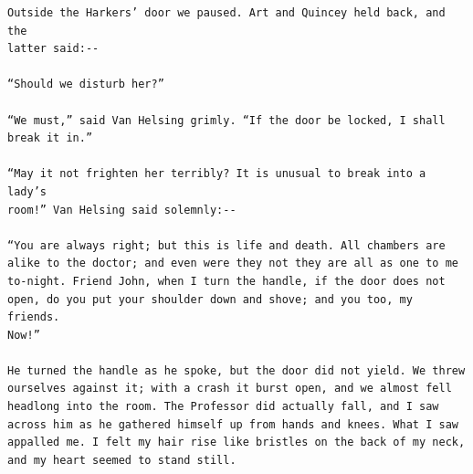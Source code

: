 \documentclass{article}
\begin{document}
\begin{verbatim}
Outside the Harkers’ door we paused. Art and Quincey held back, and the
latter said:--

“Should we disturb her?”

“We must,” said Van Helsing grimly. “If the door be locked, I shall
break it in.”

“May it not frighten her terribly? It is unusual to break into a lady’s
room!” Van Helsing said solemnly:--

“You are always right; but this is life and death. All chambers are
alike to the doctor; and even were they not they are all as one to me
to-night. Friend John, when I turn the handle, if the door does not
open, do you put your shoulder down and shove; and you too, my friends.
Now!”

He turned the handle as he spoke, but the door did not yield. We threw
ourselves against it; with a crash it burst open, and we almost fell
headlong into the room. The Professor did actually fall, and I saw
across him as he gathered himself up from hands and knees. What I saw
appalled me. I felt my hair rise like bristles on the back of my neck,
and my heart seemed to stand still.


\end{verbatim}
\end{document}
